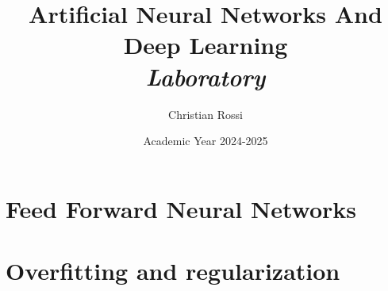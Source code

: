 \documentclass[12pt, a4paper]{report}
\title{\textbf{Artificial Neural Networks And Deep Learning} \\ \textit{Laboratory}}
\author{Christian Rossi}
\date{Academic Year 2024-2025}
\begin{document}
    \maketitle

    

    \cleardoublepage

    \tableofcontents

    \cleardoublepage

    \chapter{Feed Forward Neural Networks}
    
    
    
    
    
    

    \chapter{Overfitting and regularization}
    
    
    
    
    
    
    
    
    
\end{document}

